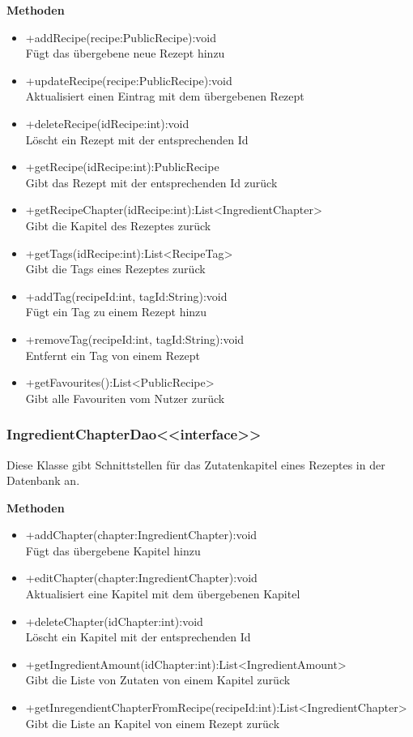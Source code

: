\textbf{Methoden}
\begin{itemize}
	\item +addRecipe(recipe:PublicRecipe):void \\Fügt das übergebene neue Rezept hinzu
	\item +updateRecipe(recipe:PublicRecipe):void \\Aktualisiert einen Eintrag mit dem übergebenen Rezept
	\item +deleteRecipe(idRecipe:int):void \\Löscht ein Rezept mit der entsprechenden Id
	\item +getRecipe(idRecipe:int):PublicRecipe \\Gibt das Rezept mit der entsprechenden Id zurück
	\item +getRecipeChapter(idRecipe:int):List<IngredientChapter> \\Gibt die Kapitel des Rezeptes zurück
	\item +getTags(idRecipe:int):List<RecipeTag> \\Gibt die Tags eines Rezeptes zurück
	\item +addTag(recipeId:int, tagId:String):void \\Fügt ein Tag zu einem Rezept hinzu
	\item +removeTag(recipeId:int, tagId:String):void \\Entfernt ein Tag von einem Rezept
	\item +getFavourites():List<PublicRecipe> \\Gibt alle Favouriten vom Nutzer zurück
\end{itemize}

\subsubsection{IngredientChapterDao<<interface>>}
Diese Klasse gibt Schnittstellen für das Zutatenkapitel eines Rezeptes in der Datenbank an.

\textbf{Methoden}
\begin{itemize}
	\item +addChapter(chapter:IngredientChapter):void \\Fügt das übergebene Kapitel hinzu
	\item +editChapter(chapter:IngredientChapter):void \\Aktualisiert eine Kapitel mit dem übergebenen Kapitel
	\item +deleteChapter(idChapter:int):void \\Löscht ein Kapitel mit der entsprechenden Id
	\item +getIngredientAmount(idChapter:int):List<IngredientAmount> \\ Gibt die Liste von Zutaten von einem Kapitel zurück
	\item +getInregendientChapterFromRecipe(recipeId:int):List<IngredientChapter> \\Gibt die Liste an Kapitel von einem Rezept zurück
\end{itemize}


